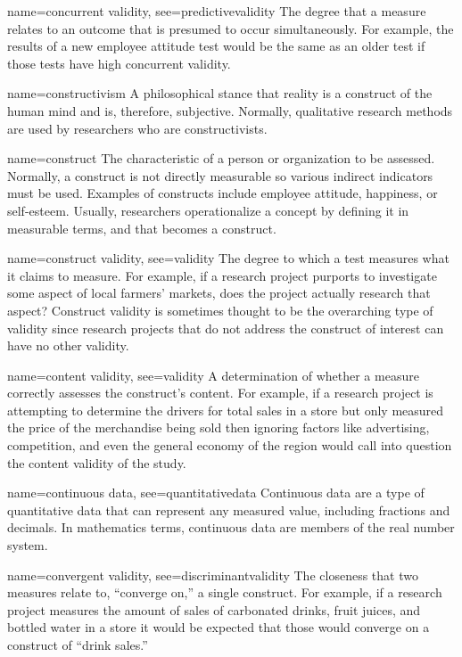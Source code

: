 {name={concurrent validity},
	see={predictivevalidity}}
{%
	The degree that a measure relates to an outcome that is presumed to occur simultaneously. For example, the results of a new employee attitude test would be the same as an older test if those tests have high concurrent validity.
}

{name={constructivism}}
{%
	A philosophical stance that reality is a construct of the human mind and is, therefore, subjective. Normally, qualitative research methods are used by researchers who are constructivists.
}

{name={construct}}
{%
	The characteristic of a person or organization to be assessed. Normally, a construct is not directly measurable so various indirect indicators must be used. Examples of constructs include employee attitude, happiness, or self-esteem. Usually, researchers operationalize a concept by defining it in measurable terms, and that becomes a construct.
}

{name={construct validity},
	see={validity}}
{%
	The degree to which a test measures what it claims to measure. For example, if a research project purports to investigate some aspect of local farmers' markets, does the project actually research that aspect? Construct validity is sometimes thought to be the overarching type of validity since research projects that do not address the construct of interest can have no other validity.
}

{name={content validity},
	see={validity}}
{%
	A determination of whether a measure correctly assesses the construct's content. For example, if a research project is attempting to determine the drivers for total sales in a store but only measured the price of the merchandise being sold then ignoring factors like advertising, competition, and even the general economy of the region would call into question the content validity of the study.
}

{name={continuous data},
	see={quantitativedata}}
{%
	Continuous data are a type of quantitative data that can represent any measured value, including fractions and decimals. In mathematics terms, continuous data are members of the real number system. 
}


{name={convergent validity},
	see={discriminantvalidity}}
{%
	The closeness that two measures relate to, ``converge on,'' a single construct. For example, if a research project measures the amount of sales of carbonated drinks, fruit juices, and bottled water in a store it would be expected that those would converge on a construct of ``drink sales.''
}

